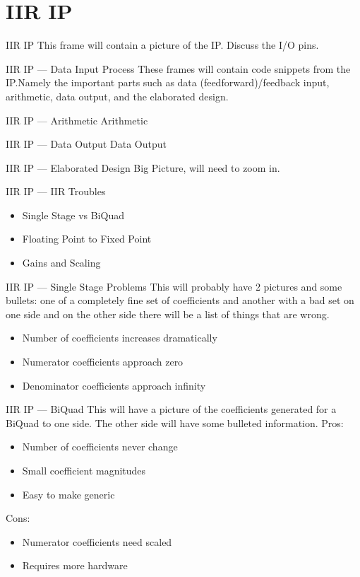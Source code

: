 \documentclass{beamer}
\begin{document}
\section{IIR IP}
\begin{frame}{IIR IP}
  This frame will contain a picture of the IP. Discuss the I/O pins.
\end{frame}
\begin{frame}{IIR IP --- Data Input Process }
  These frames will contain code snippets from the IP.\@ Namely the important
  parts such as data (feedforward)/feedback input, arithmetic, data output, and
  the elaborated design.
\end{frame}
\begin{frame}{IIR IP --- Arithmetic}
  Arithmetic
\end{frame}
\begin{frame}{IIR IP --- Data Output}
  Data Output
\end{frame}
\begin{frame}{IIR IP --- Elaborated Design }
  Big Picture, will need to zoom in.
\end{frame}
\begin{frame}{IIR IP --- IIR Troubles }
  \begin{itemize}[<+>]
  \item Single Stage vs BiQuad
  \item Floating Point to Fixed Point
  \item Gains and Scaling
  \end{itemize}
\end{frame}
\begin{frame}{IIR IP --- Single Stage Problems}
  This will probably have 2 pictures and some bullets: one of a completely fine
  set of coefficients and another with a bad set on one side and on the other
  side there will be a list of things that are wrong.
  \begin{itemize}[<+>]
  \item Number of coefficients increases dramatically
  \item Numerator coefficients approach zero
  \item Denominator coefficients approach infinity
  \end{itemize}
\end{frame}
\begin{frame}{IIR IP --- BiQuad}
  This will have a picture of the coefficients generated for a BiQuad to one
  side. The other side will have some bulleted information.
  Pros:
  \begin{itemize}[<+>]
  \item Number of coefficients never change
  \item Small coefficient magnitudes
  \item Easy to make generic
  \end{itemize}

  Cons:
  \begin{itemize}[<+>]
  \item Numerator coefficients need scaled
  \item Requires more hardware
  \end{itemize}
\end{frame}
\end{document}
